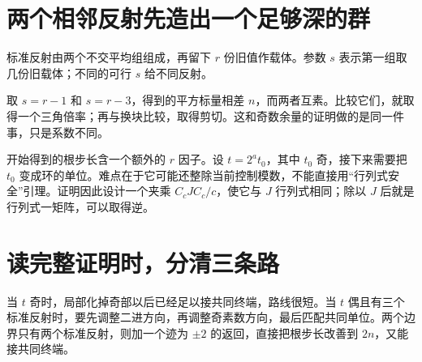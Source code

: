 \documentclass[11pt,a4paper,oneside,openany]{book}
\theoremstyle{definition}
\numberwithin{equation}{chapter}
\begin{document}
\section{两个相邻反射先造出一个足够深的群}
标准反射由两个不交平均组组成，再留下 $r$ 份旧值作载体。参数 $s$ 表示第一组取几份旧载体；不同的可行 $s$ 给不同反射。

取 $s=r-1$ 和 $s=r-3$，得到的平方标量相差 $n$，而两者互素。比较它们，就取得一个三角倍率；再与换块比较，取得剪切。这和奇数余量的证明做的是同一件事，只是系数不同。

开始得到的根步长含一个额外的 $r$ 因子。设 $t=2^a t_0$，其中 $t_0$ 奇，接下来需要把 $t_0$ 变成环的单位。难点在于它可能还整除当前控制模数，不能直接用“行列式安全”引理。证明因此设计一个夹乘 $C_cJC_c/c$，使它与 $J$ 行列式相同；除以 $J$ 后就是行列式一矩阵，可以取得逆。

\section{读完整证明时，分清三条路}
当 $t$ 奇时，局部化掉奇部以后已经足以接共同终端，路线很短。当 $t$ 偶且有三个标准反射时，要先调整二进方向，再调整奇素数方向，最后匹配共同单位。两个边界只有两个标准反射，则加一个迹为 $\pm2$ 的返回，直接把根步长改善到 $2n$，又能接共同终端。
\end{document}
